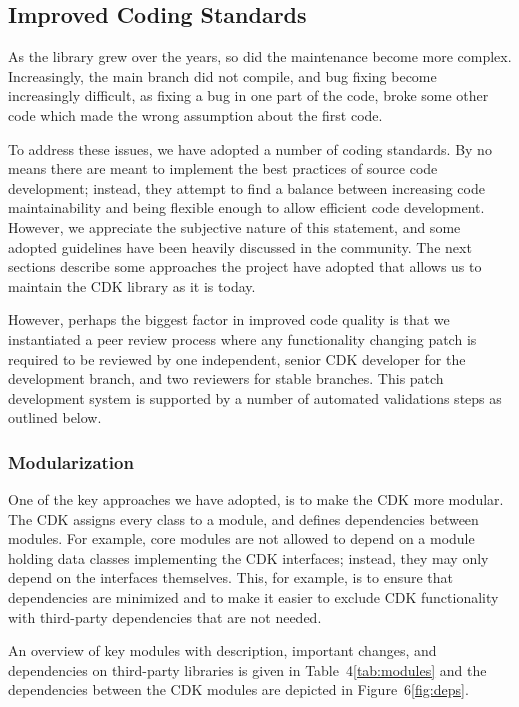 \documentclass[10pt]{bmcart}
\begin{document}

\subsection*{Improved Coding Standards}

As the library grew over the years, so did the maintenance become more complex. Increasingly,
the main branch did not compile, and bug fixing become increasingly difficult, as fixing a bug
in one part of the code, broke some other code which made the wrong assumption about the first
code.

To address these issues, we have adopted a number of coding standards. By no means there are
meant to implement the best practices of source code development; instead, they attempt to find
a balance between increasing code maintainability and being flexible enough to allow efficient
code development. However, we appreciate the subjective nature of this statement, and some
adopted guidelines have been heavily discussed in the community.
The next sections describe some approaches the project have adopted that allows us to
maintain the CDK library as it is today. 

However, perhaps the biggest factor in improved code quality is that we
instantiated a peer review process where any functionality changing patch is
required to be reviewed by one independent, senior CDK developer for  the development
branch, and two reviewers for stable branches. This patch development system
is supported by a number of automated validations steps as outlined below.

  \subsubsection*{Modularization}
  
One of the key approaches we have adopted, is to make the CDK more modular. The CDK assigns
every class to a module, and defines dependencies between modules. For example, core modules
are not allowed to depend on a module holding data classes implementing the CDK interfaces;
instead, they may only depend on the interfaces themselves. This, for example, is to ensure
that dependencies are minimized and to make it easier to exclude CDK functionality with
third-party dependencies that are not needed.

An overview of key modules with description, important changes, and dependencies
on third-party libraries is given in Table~4\ref{tab:modules} and the dependencies
between the CDK modules are depicted in Figure~6\ref{fig:deps}.
\end{document}
